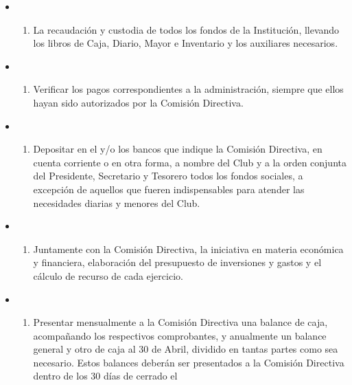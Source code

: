 \documentclass[]{book}
\providecommand{\tightlist}{%
  \setlength{\itemsep}{0pt}\setlength{\parskip}{0pt}}
\begin{document}
\begin{itemize}
  \begin{itemize}
  \item
    \begin{enumerate}
    \def\labelenumi{\alph{enumi})}
    \tightlist
    \item
      La recaudación y custodia de todos los fondos de la Institución,
      llevando los libros de Caja, Diario, Mayor e Inventario y los
      auxiliares necesarios.
    \end{enumerate}
  \item
    \begin{enumerate}
    \def\labelenumi{\alph{enumi})}
    \setcounter{enumi}{1}
    \tightlist
    \item
      Verificar los pagos correspondientes a la administración, siempre
      que ellos hayan sido autorizados por la Comisión Directiva.
    \end{enumerate}
  \item
    \begin{enumerate}
    \def\labelenumi{\alph{enumi})}
    \setcounter{enumi}{2}
    \tightlist
    \item
      Depositar en el y/o los bancos que indique la Comisión Directiva,
      en cuenta corriente o en otra forma, a nombre del Club y a la
      orden conjunta del Presidente, Secretario y Tesorero todos los
      fondos sociales, a excepción de aquellos que fueren indispensables
      para atender las necesidades diarias y menores del Club.
    \end{enumerate}
  \item
    \begin{enumerate}
    \def\labelenumi{\alph{enumi})}
    \setcounter{enumi}{3}
    \tightlist
    \item
      Juntamente con la Comisión Directiva, la iniciativa en materia
      económica y financiera, elaboración del presupuesto de inversiones
      y gastos y el cálculo de recurso de cada ejercicio.
    \end{enumerate}
  \item
    \begin{enumerate}
    \def\labelenumi{\alph{enumi})}
    \setcounter{enumi}{4}
    \tightlist
    \item
      Presentar mensualmente a la Comisión Directiva una balance de
      caja, acompañando los respectivos comprobantes, y anualmente un
      balance general y otro de caja al 30 de Abril, dividido en tantas
      partes como sea necesario. Estos balances deberán ser presentados
      a la Comisión Directiva dentro de los 30 días de cerrado el

\end{enumerate}
\end{itemize}
\end{itemize}
\end{document}
